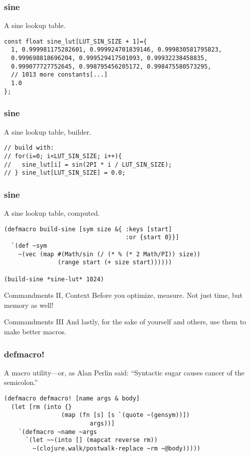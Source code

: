 \documentclass[aspectratio=169]{beamer}
\begin{document}
  \begin{frame}[fragile]
    \frametitle{sine}
    \begin{listing}[H]
      \caption{A sine lookup table.}
      \begin{verbatim}
const float sine_lut[LUT_SIN_SIZE + 1]={
  1, 0.999981175282601, 0.999924701839146, 0.999830581795823,
  0.999698818696204, 0.999529417501093, 0.99932238458835,
  0.999077727752645, 0.998795456205172, 0.998475580573295,
  // 1013 more constants[...]
  1.0
};
      \end{verbatim}
    \end{listing}
  \end{frame}
  \begin{frame}[fragile]
    \frametitle{sine}
    \begin{listing}[H]
      \caption{A sine lookup table, builder.}
      \begin{verbatim}
// build with:
// for(i=0; i<LUT_SIN_SIZE; i++){
//   sine_lut[i] = sin(2PI * i / LUT_SIN_SIZE);
// } sine_lut[LUT_SIN_SIZE] = 0.0;
      \end{verbatim}
    \end{listing}
  \end{frame}
  \begin{frame}[fragile]
    \frametitle{sine}
    \begin{listing}[H]
      \caption{A sine lookup table, computed.}
      \begin{verbatim}
(defmacro build-sine [sym size &{ :keys [start] 
                                  :or {start 0}}]
  `(def ~sym
    ~(vec (map #(Math/sin (/ (* % (* 2 Math/PI)) size))
               (range start (+ size start))))))

(build-sine *sine-lut* 1024)
      \end{verbatim}
    \end{listing}
  \end{frame}
  \begin{frame}{Commandments II, Context}
    \Large Before you optimize, measure. Not just time, but memory as well!
  \end{frame}
  \begin{frame}{Commandments III}
    \Large And lastly, for the sake of yourself and others, use them to make better macros.
  \end{frame}
  \begin{frame}[fragile]
    \frametitle{defmacro!}
    \begin{listing}[H]
      \caption{A macro utility—or, as Alan Perlin said: “Syntactic sugar causes cancer of the semicolon.”}
      \begin{verbatim}
(defmacro defmacro! [name args & body]
  (let [rm (into {}
                (map (fn [s] [s `(quote ~(gensym))])
                        args))]
    `(defmacro ~name ~args
      `(let ~~(into [] (mapcat reverse rm))
        ~(clojure.walk/postwalk-replace ~rm ~@body)))))
      \end{verbatim}
    \end{listing}
  \end{frame}
\end{document}
